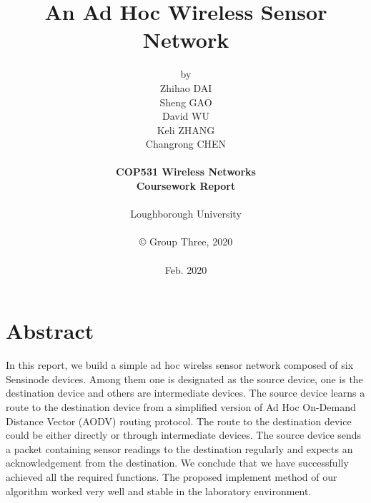 \title{\bf An Ad Hoc Wireless Sensor Network}

\author{by\\
Zhihao DAI\\
Sheng GAO\\
David WU\\
Keli ZHANG\\
Changrong CHEN\\
\\
{\bf COP531 Wireless Networks}\\
{\bf Coursework Report}\\
\\
Loughborough University\\
\\
\copyright
\hspace{1 dd} Group Three, 2020\\
\\
Feb. 2020
}
\date{} %

\maketitle


% 
% 

\chapter*{Abstract}
In this report, we build a simple ad hoc wirelss sensor network composed of six Sensinode devices.
Among them one is designated as the source device, one is the destination device and others are intermediate devices.
The source device learns a route to the destination device from a simplified version of Ad Hoc On-Demand Distance Vector (AODV) routing protocol.
The route to the destination device could be either directly or through intermediate devices.
The source device sends a packet containing sensor readings to the destination regularly and expects an acknowledgement from the destination.
We conclude that we have successfully achieved all the required functions.
The proposed implement method of our algorithm worked very well and stable in the laboratory environment.

